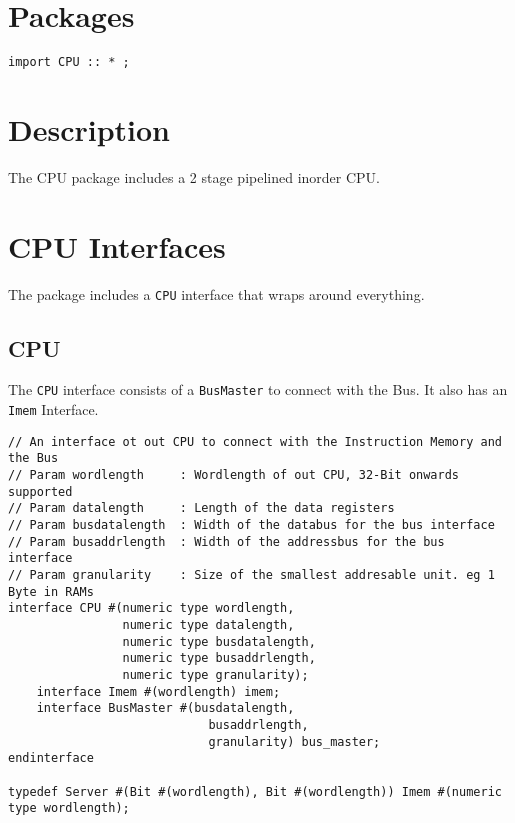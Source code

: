 \begin{paper}
\renewcommand*{\pagemark}{}

\section*{Packages\sdot}
\texttt{import CPU :: * ;}
\section*{Description\sdot}
The CPU package includes a 2 stage pipelined inorder CPU.

\section*{CPU Interfaces\sdot}
The package includes a \texttt{CPU} interface that wraps around everything. 

\subsection*{CPU\sdot}
The \texttt{CPU} interface consists of a \texttt{BusMaster} to connect with the Bus. It also has an \texttt{Imem} Interface.

\begin{verbatim}
// An interface ot out CPU to connect with the Instruction Memory and the Bus
// Param wordlength     : Wordlength of out CPU, 32-Bit onwards supported
// Param datalength     : Length of the data registers
// Param busdatalength  : Width of the databus for the bus interface
// Param busaddrlength  : Width of the addressbus for the bus interface
// Param granularity    : Size of the smallest addresable unit. eg 1 Byte in RAMs
interface CPU #(numeric type wordlength, 
                numeric type datalength, 
                numeric type busdatalength, 
                numeric type busaddrlength, 
                numeric type granularity);
    interface Imem #(wordlength) imem;
    interface BusMaster #(busdatalength, 
                            busaddrlength, 
                            granularity) bus_master;
endinterface

typedef Server #(Bit #(wordlength), Bit #(wordlength)) Imem #(numeric type wordlength);

\end{verbatim}\\\\




\end{paper}
